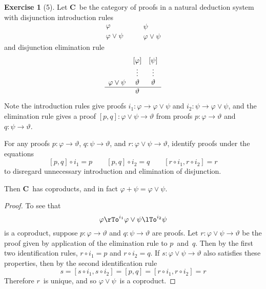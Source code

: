 \documentclass[letterpaper,12pt]{article}
\newcommand{\after}{\circ}
\newcommand{\copair}[2]{[{#1},{#2}]}
\newcommand{\cat}[1]{\mathbf{#1}}
\newcommand{\C}{\cat{C}}
\theoremstyle{definition}
\newtheorem*{exer}{Exercise}
\theoremstyle{remark}
\theoremstyle{direction}
\begin{document}
\begin{exer}[5]
Let \(\C\)~be the category of proofs in a natural deduction system with disjunction introduction rules
\[\begin{array}{c}
\varphi\\
\hline
\varphi\lor\psi
\end{array}
\qquad
\begin{array}{c}
\psi\\
\hline
\varphi\lor\psi
\end{array}\]
and disjunction elimination rule
\[\begin{array}{ccc}
&[\varphi]&[\psi]\\
&\vdots&\vdots\\
\varphi\lor\psi&\vartheta&\vartheta\\
\hline
&\vartheta&
\end{array}\]
Note the introduction rules give proofs \(i_1:\varphi\to\varphi\lor\psi\) and \(i_2:\psi\to\varphi\lor\psi\), and the elimination rule gives a proof \(\copair{p}{q}:\varphi\lor\psi\to\vartheta\) from proofs \(p:\varphi\to\vartheta\) and \(q:\psi\to\vartheta\).

For any proofs \(p:\varphi\to\vartheta\), \(q:\psi\to\vartheta\), and \(r:\varphi\lor\psi\to\vartheta\), identify proofs under the equations
\[\copair{p}{q}\after i_1=p\qquad \copair{p}{q}\after i_2=q\qquad [r\after i_1,r\after i_2]=r\]
to disregard unnecessary introduction and elimination of disjunction.

Then \(\C\)~has coproducts, and in fact \(\varphi+\psi=\varphi\lor\psi\).
\end{exer}
\begin{proof}
To see that
\[\varphi\rTo^{i_1}\varphi\lor\psi\lTo^{i_2}\psi\]
is a coproduct, suppose \(p:\varphi\to\vartheta\) and \(q:\psi\to\vartheta\) are proofs. Let \(r:\varphi\lor\psi\to\vartheta\) be the proof given by application of the elimination rule to \(p\)~and~\(q\). Then by the first two identification rules, \(r\after i_1=p\) and \(r\after i_2=q\). If \(s:\varphi\lor\psi\to\vartheta\) also satisfies these properties, then by the second identification rule
\[s=[s\after i_1,s\after i_2]=[p,q]=[r\after i_1,r\after i_2]=r\]
Therefore \(r\)~is unique, and so \(\varphi\lor\psi\)~is a coproduct.
\end{proof}
\end{document}
